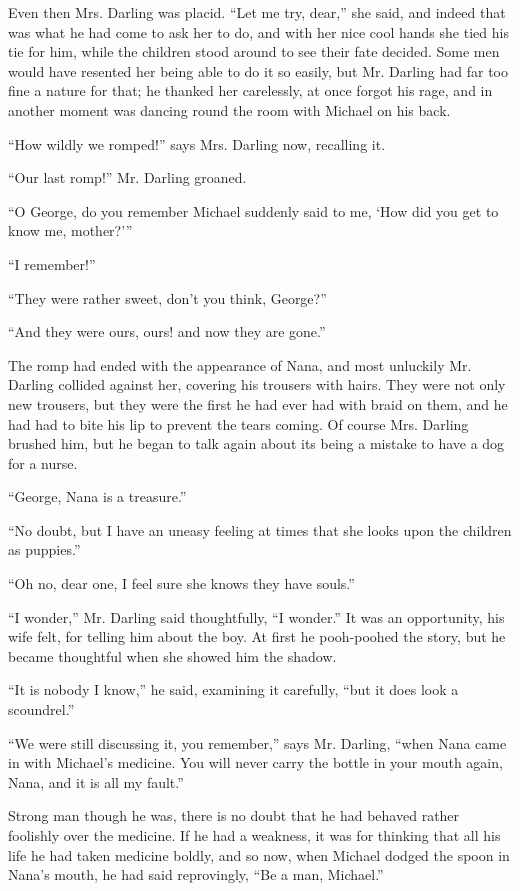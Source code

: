Even then Mrs. Darling was placid.
``Let me try, dear,'' she said, and indeed that was what he had come to ask her
to do, and with her nice cool hands she tied his tie for him, while the children
stood around to see their fate decided.
Some men would have resented her being able to do it so easily, but Mr. Darling
had far too fine a nature for that; he thanked her carelessly, at once forgot
his rage, and in another moment was dancing round the room with Michael on his
back.

``How wildly we romped!'' says Mrs. Darling now, recalling it.

``Our last romp!'' Mr. Darling groaned.

``O George, do you remember Michael suddenly said to me, `How did you get to
know me, mother?'''

``I remember!''

``They were rather sweet, don't you think, George?''

``And they were ours, ours! and now they are gone.''

The romp had ended with the appearance of Nana, and most unluckily Mr. Darling
collided against her, covering his trousers with hairs.
They were not only new trousers, but they were the first he had ever had with
braid on them, and he had had to bite his lip to prevent the tears coming.
Of course Mrs. Darling brushed him, but he began to talk again about its being a
mistake to have a dog for a nurse.

``George, Nana is a treasure.''

``No doubt, but I have an uneasy feeling at times that she looks upon the
children as puppies.''

``Oh no, dear one, I feel sure she knows they have souls.''

``I wonder,'' Mr. Darling said thoughtfully, ``I wonder.''
It was an opportunity, his wife felt, for telling him about the boy.
At first he pooh-poohed the story, but he became thoughtful when she showed him
the shadow.

``It is nobody I know,'' he said, examining it carefully, ``but it does look a
scoundrel.''

``We were still discussing it, you remember,'' says Mr. Darling, ``when Nana
came in with Michael's medicine.
You will never carry the bottle in your mouth again, Nana, and it is all my
fault.''

Strong man though he was, there is no doubt that he had behaved rather foolishly
over the medicine.
If he had a weakness, it was for thinking that all his life he had taken
medicine boldly, and so now, when Michael dodged the spoon in Nana's mouth, he
had said reprovingly, ``Be a man, Michael.''

